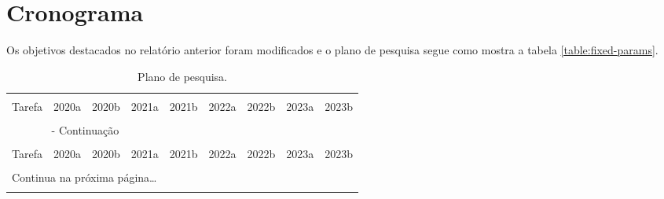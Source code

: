 \chapter{Cronograma}
\label{cronograma}
\renewcommand{\thefootnote}{\arabic{footnote}}

Os objetivos destacados no relatório anterior foram modificados e o plano de pesquisa segue como mostra a tabela \ref{table:fixed-params}.

\begin{center}
    \setcaptionmargin{1cm}
    \scriptsize
    \begin{longtable}{lcccccccc}
        \caption[Plano de pesquisa]{Plano de pesquisa.}\\
        \hline \hline \\[-2ex]
        \multicolumn{1}{c}{Tarefa} &
        \multicolumn{1}{c}{2020a} &
        \multicolumn{1}{c}{2020b} &
        \multicolumn{1}{c}{2021a} &
        \multicolumn{1}{c}{2021b} &
        \multicolumn{1}{c}{2022a} &
        \multicolumn{1}{c}{2022b} &
        \multicolumn{1}{c}{2023a} &
        \multicolumn{1}{c}{2023b} 
        
        \\[0.5ex] \hline
        \\[-1.8ex]
        
        \endfirsthead
        
        \multicolumn{4}{c}{\footnotesize{{\slshape{{\tablename} \thetable{}}} - Continuação}}\\[0.5ex]
        
        \hline \hline\\[-2ex]
        
        \multicolumn{1}{c}{Tarefa} &
        \multicolumn{1}{c}{2020a} &
        \multicolumn{1}{c}{2020b} &
        \multicolumn{1}{c}{2021a} &
        \multicolumn{1}{c}{2021b} &
        \multicolumn{1}{c}{2022a} &
        \multicolumn{1}{c}{2022b} &
        \multicolumn{1}{c}{2023a} &
        \multicolumn{1}{c}{2023b} 
        
        \\[0.5ex] \hline
        \\[-1.8ex]
        
        \endhead
        
        \multicolumn{5}{l}{{\footnotesize{Continua na próxima página\ldots}}}\\
        \endfoot
        \hline
        
        \endlastfoot


\end{longtable}
\end{center}
